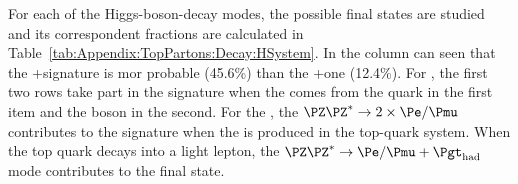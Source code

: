 \begin{comment}
\begin{multicols}{2}
For the \Ptau leptons 
\begin{itemize}
	\item  BR($\tau \rightarrow \Pe \Pnu \Pnu)= 17.82\%$
	\item  BR($\tau \rightarrow \Pmu \Pnu \Pnu)= 17.39\%$
	\item  BR($\tau \rightarrow$ Hadrons)$= 64.74\%$
\end{itemize}
\columnbreak
For the \PW bosons
\begin{itemize}
	\item  BR($\PW \rightarrow \Pe \Pnu) = 10.71\%$
	\item  BR($\PW \rightarrow \Pmu \Pnu) = 10.63\%$
	\item  BR($\PW \rightarrow \Ptau \Pnu) =11.38\%$
	\item  BR($\PW \rightarrow$ Hadrons)$= 67.41\%$
\end{itemize}
\end{multicols}
For the \PZ bosons
\begin{itemize}
	\item  BR($\PZ \rightarrow \Pe \Pe)= 3.36\%$
	\item  BR($\PZ \rightarrow \Pmu \Pmu)= 3.36\%$
	\item  BR($\PZ \rightarrow \Ptau \Ptau)= 3.36\%$
	\item  BR($\PZ \rightarrow \Pnu \Pnu)= 20\%$
	\item  BR($\PZ \rightarrow$ Hadrons)$= 69.91\%$
\end{itemize}



Note that the BRs of the considered decay modes are normalised
so that its sum is the 100\% . 
\end{comment}


For each of the Higgs-boson-decay modes, the possible final states are studied %
and its correspondent fractions are calculated in Table~\ref{tab:Appendix:TopPartons:Decay:HSystem}.
In the \Htautau column can seen that the \tauhad+\taulep signature is mor probable (45.6\%) than
the \taulep+\taulep one (12.4\%).  For \HWW, the first two rows take part  in the \dileptau signature when the \tauhad comes from 
the \Ptop quark in the first item and the \PHiggs boson in the second. 
For the \ZZ, the $\ZZ \rightarrow 2 \times \emu$ contributes 
to the \dileptau signature when the \tauhad is produced in the top-quark system. When the top quark decays into a 
light lepton, the $\ZZ \rightarrow \emu + \tauhad$ mode contributes to the \dileptau final state.


